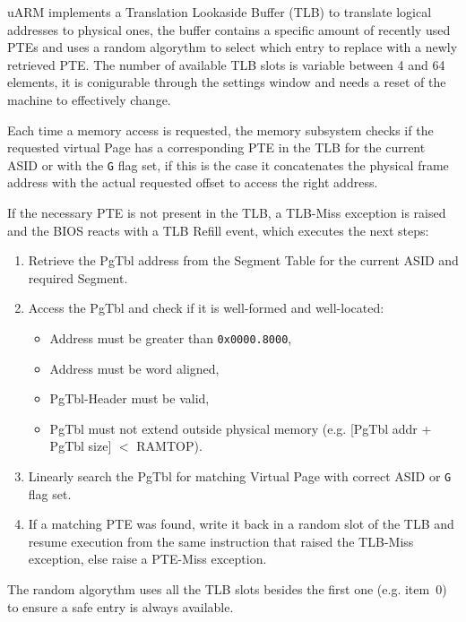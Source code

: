 

\vspace{10px}

uARM implements a Translation Lookaside Buffer (TLB) to translate logical addresses to physical ones, the buffer contains a specific amount of recently used PTEs and uses a random algorythm to select which entry to replace with a newly retrieved PTE.
The number of available TLB slots is variable between 4 and 64 elements, it is conigurable through the settings window and needs a reset of the machine to effectively change.

Each time a memory access is requested, the memory subsystem checks if the requested virtual Page has a corresponding PTE in the TLB for the current ASID or with the \texttt{G} flag set, if this is the case it concatenates the physical frame address with the actual requested offset to access the right address.

If the necessary PTE is not present in the TLB, a TLB-Miss exception is raised and the BIOS reacts with a TLB Refill event, which executes the next steps:
\begin{enumerate}
\item Retrieve the PgTbl address from the Segment Table for the current ASID and required Segment.
\item Access the PgTbl and check if it is well-formed and well-located:
	\begin{itemize}
	\item Address must be greater than \texttt{0x0000.8000},
	\item Address must be word aligned,
	\item PgTbl-Header must be valid,
	\item PgTbl must not extend outside physical memory (e.g. [PgTbl addr + PgTbl size] $<$ RAMTOP).
	\end{itemize}
\item Linearly search the PgTbl for matching Virtual Page with correct ASID or \texttt{G} flag set.
\item If a matching PTE was found, write it back in a random slot of the TLB and resume execution from the same instruction that raised the TLB-Miss exception, else raise a PTE-Miss exception.
\end{enumerate}

The random algorythm uses all the TLB slots besides the first one (e.g. item~0) to ensure a safe entry is always available.
